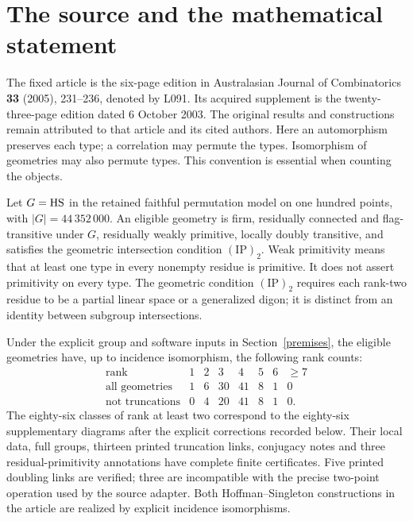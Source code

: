 \begin{abstract}
We assemble complete finite proofs for the classification and two
constructions in D.~Leemans, \emph{The residually weakly primitive
geometries of HS}, together with the acquired supplementary diagrams.
The classification counts are recovered. The diagrams, local groups and
full automorphism groups are compared occurrence by occurrence, with
corrections stated explicitly. Earlier sporadic classifications quoted
by the article retain their own equivalence conventions and premises.
The accompanying proof volume preserves the complete accepted arguments
and finite certificates on which this synthesis depends.
\end{abstract}

\section{The source and the mathematical statement}
The fixed article is the six-page edition in Australasian Journal of
Combinatorics \textbf{33} (2005), 231--236, denoted by L091. Its acquired
supplement is the twenty-three-page edition dated 6 October 2003.
The original results and constructions remain attributed to that article
and its cited authors. Here an automorphism preserves each type; a
correlation may permute the types. Isomorphism of geometries may also
permute types. This convention is essential when counting the objects.

Let $G=\mathrm{HS}$ in the retained faithful permutation model on one hundred
points, with $|G|=44\,352\,000$. An eligible geometry is firm, residually
connected and flag-transitive under $G$, residually weakly primitive,
locally doubly transitive, and satisfies the geometric intersection
condition $(\mathrm{IP})_2$. Weak primitivity means that at least one
type in every nonempty residue is primitive. It does not assert
primitivity on every type. The geometric condition $(\mathrm{IP})_2$
requires each rank-two residue to be a partial linear space or a
generalized digon; it is distinct from an identity between subgroup
intersections.

\begin{theorem}\label{classification}
Under the explicit group and software inputs in Section~\ref{premises},
the eligible geometries have, up to incidence isomorphism, the following
rank counts:
\[
\begin{array}{c|rrrrrrr}
\text{rank}&1&2&3&4&5&6&\geq7\\\hline
\text{all geometries}&1&6&30&41&8&1&0\\
\text{not truncations}&0&4&20&41&8&1&0.
\end{array}
\]
The eighty-six classes of rank at least two correspond to the eighty-six
supplementary diagrams after the explicit corrections recorded below.
Their local data, full groups, thirteen printed truncation links,
conjugacy notes and three residual-primitivity annotations have complete
finite certificates. Five printed doubling links are verified; three
are incompatible with the precise two-point operation used by the
source adapter. Both Hoffman--Singleton constructions in the article
are realized by explicit incidence isomorphisms.
\end{theorem}

